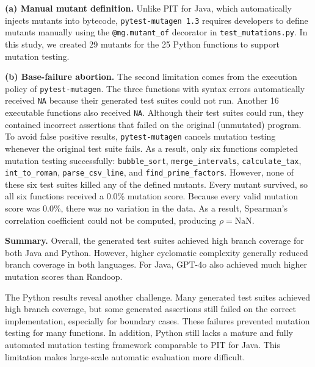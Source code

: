 \textbf{(a) Manual mutant definition.}
Unlike PIT for Java, which automatically injects mutants into bytecode, \texttt{pytest-mutagen 1.3} requires developers to define mutants manually using the \texttt{@mg.mutant\_of} decorator in \texttt{test\_mutations.py}. In this study, we created 29 mutants for the 25 Python functions to support mutation testing.

\textbf{(b) Base-failure abortion.}
The second limitation comes from the execution policy of \texttt{pytest-mutagen}.
The three functions with syntax errors automatically received \texttt{NA} because their generated test suites could not run.
Another 16 executable functions also received \texttt{NA}. Although their test suites could run, they contained incorrect assertions that failed on the original (unmutated) program. To avoid false positive results, \texttt{pytest-mutagen} cancels mutation testing whenever the original test suite fails.
As a result, only six functions completed mutation testing successfully: \texttt{bubble\_sort}, \texttt{merge\_intervals}, \texttt{calculate\_tax}, \texttt{int\_to\_roman}, \texttt{parse\_csv\_line}, and \texttt{find\_prime\_factors}.
However, none of these six test suites killed any of the defined mutants. Every mutant survived, so all six functions received a 0.0\% mutation score.
Because every valid mutation score was 0.0\%, there was no variation in the data. As a result, Spearman's correlation coefficient could not be computed, producing $\rho = \text{NaN}$.

\textbf{Summary.}
Overall, the generated test suites achieved high branch coverage for both Java and Python. However, higher cyclomatic complexity generally reduced branch coverage in both languages. For Java, GPT-4o also achieved much higher mutation scores than Randoop.

The Python results reveal another challenge. Many generated test suites achieved high branch coverage, but some generated assertions still failed on the correct implementation, especially for boundary cases. These failures prevented mutation testing for many functions. In addition, Python still lacks a mature and fully automated mutation testing framework comparable to PIT for Java. This limitation makes large-scale automatic evaluation more difficult.
